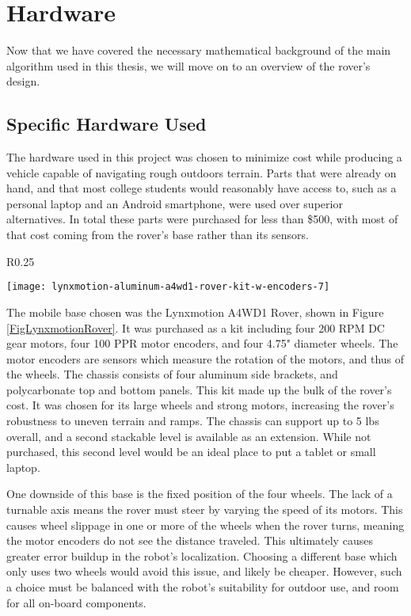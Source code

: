 \chapter{Hardware}

Now that we have covered the necessary mathematical background of the main algorithm used in this thesis, we will move on to an overview of the rover's design. 
\section{Specific Hardware Used} \label{sectionSpecificHardware}
The hardware used in this project was chosen to minimize cost while producing a vehicle capable of navigating rough outdoors terrain. Parts that were already on hand, and that most college students would reasonably have access to, such as a personal laptop and an Android smartphone, were used over superior alternatives. In total these parts were purchased for less than \$500, with most of that cost coming from the rover's base rather than its sensors.

\begin{wrapfigure}{R}{0.25\textwidth} %
	\caption{\cite{fig_lynxmotion_rover}}
	\centering
	\texttt{[image: lynxmotion-aluminum-a4wd1-rover-kit-w-encoders-7]}
	\label{FigLynxmotionRover}
\end{wrapfigure}

The mobile base chosen was the Lynxmotion A4WD1 Rover, shown in Figure \ref{FigLynxmotionRover}. It was purchased as a kit including four 200 RPM DC gear motors, four 100 PPR motor encoders, and four 4.75" diameter wheels. The motor encoders are sensors which measure the rotation of the motors, and thus of the wheels. The chassis consists of four aluminum side brackets, and polycarbonate top and bottom panels. This kit made up the bulk of the rover's cost. It was chosen for its large wheels and strong motors, increasing the rover's robustness to uneven terrain and ramps. The chassis can support up to 5 lbs overall, and a second stackable level is available as an extension. While not purchased, this second level would be an ideal place to put a tablet or small laptop.

One downside of this base is the fixed position of the four wheels. The lack of a turnable axis means the rover must steer by varying the speed of its motors. This causes wheel slippage in one or more of the wheels when the rover turns, meaning the motor encoders do not see the distance traveled. This ultimately causes greater error buildup in the robot's localization. Choosing a different base which only uses two wheels would avoid this issue, and likely be cheaper. However, such a choice must be balanced with the robot's suitability for outdoor use, and room for all on-board components.

